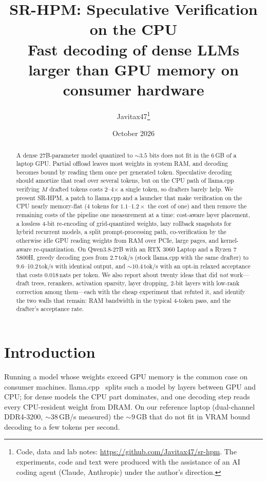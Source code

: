 \documentclass[10pt]{article}
\title{\textbf{SR-HPM: Speculative Verification on the CPU}\\[2pt]
\large Fast decoding of dense LLMs larger than GPU memory on consumer hardware}
\author{Javitax47\thanks{Code, data and lab notes: \url{https://github.com/Javitax47/sr-hpm}.
The experiments, code and text were produced with the assistance of an AI coding agent (Claude, Anthropic)
under the author's direction.}}
\date{October 2026}
\newcommand{\tps}{tok/s}
\begin{document}
\maketitle

\begin{abstract}
A dense 27B-parameter model quantized to ${\sim}3.5$ bits does not fit in the 6\,GB of a laptop GPU. Partial offload
leaves most weights in system RAM, and decoding becomes bound by reading them once per generated token. Speculative
decoding should amortize that read over several tokens, but on the CPU path of llama.cpp verifying $M$ drafted tokens
costs 2--4$\times$ a single token, so drafters barely help. We present SR-HPM, a patch to llama.cpp and a launcher
that make verification on the CPU nearly memory-flat (4 tokens for $1.1$--$1.2\times$ the cost of one) and then remove
the remaining costs of the pipeline one measurement at a time: cost-aware layer placement, a lossless 4-bit
re-encoding of grid-quantized weights, lazy rollback snapshots for hybrid recurrent models, a split prompt-processing
path, co-verification by the otherwise idle GPU reading weights from RAM over PCIe, large pages, and kernel-aware
re-quantization. On Qwen3.8-27B with an RTX 3060 Laptop and a Ryzen 7 5800H, greedy decoding goes from
2.7\,\tps{} (stock llama.cpp with the same drafter) to 9.6--10.2\,\tps{} with identical output, and
${\sim}10.4$\,\tps{} with an opt-in relaxed acceptance that costs 0.018\,nats per token. We also report about twenty
ideas that did \emph{not} work---draft trees, rerankers, activation sparsity, layer dropping, 2-bit layers with
low-rank correction among them---each with the cheap experiment that refuted it, and identify the two walls that remain:
RAM bandwidth in the typical 4-token pass, and the drafter's acceptance rate.
\end{abstract}

\section{Introduction}

Running a model whose weights exceed GPU memory is the common case on consumer machines. llama.cpp~\cite{llamacpp}
splits such a
model by layers between GPU and CPU; for dense models the CPU part dominates, and one decoding step reads every
CPU-resident weight from DRAM. On our reference laptop (dual-channel DDR4-3200, ${\sim}38$\,GB/s measured) the
${\sim}9$\,GB that do not fit in VRAM bound decoding to a few tokens per second.
\end{document}
